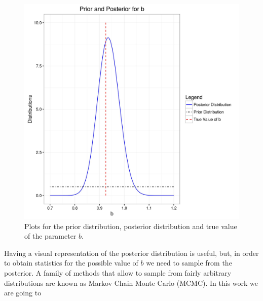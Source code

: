 \documentclass[12pt]{book}
\newcommand{\post}{\mathbb{P}_{post}}
\begin{document}
\begin{figure}[H]
\centering
\includegraphics[scale=0.6]{./FigChap3/prior_posterior.jpg}
\caption{Plots for the prior distribution, posterior distribution and true value of the parameter $b$.}
\label{figlikeprior}
\end{figure} 
Having a visual representation of the posterior distribution is useful, but, in order to obtain statistics
for the possible value of $b$ we need to sample from the posterior. A family of methods that allow to sample
from fairly arbitrary distributions are known as Markov Chain Monte Carlo (MCMC). In this work we are going to 
\end{document}

